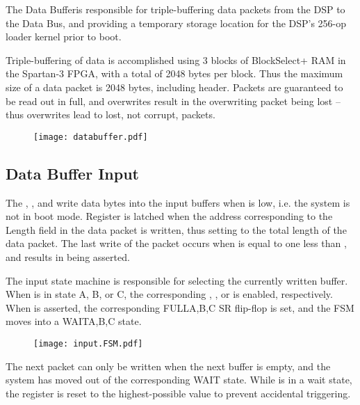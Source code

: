 
The Data Bufferis responsible for triple-buffering data packets from
the DSP to the Data Bus, and providing a temporary storage location
for the DSP's 256-op loader kernel prior to boot.
    
Triple-buffering of data is accomplished using 3 blocks of
BlockSelect+ RAM in the Spartan-3 FPGA, with a total of 2048 bytes per
block. Thus the maximum size of a data packet is 2048 bytes, including
header. Packets are guaranteed to be read out in full, and overwrites
result in the overwriting packet being lost -- thus overwrites lead to
lost, not corrupt, packets.

\begin{figure}
  \texttt{[image: databuffer.pdf]}
  
\end{figure}
        
\subsection{Data Buffer Input}
        
      
The , , and  write
data bytes into the input buffers when  is low, i.e. the
system is not in boot mode. Register  is latched
when the address corresponding to the Length field in the data packet
is written, thus setting  to the total length of
the data packet. The last write of the packet occurs when
 is equal to one less than ,
and results in  being asserted.

The input state machine  is responsible for selecting the
currently written buffer. When  is in state A, B, or C,
the corresponding , , or 
is enabled, respectively. When  is asserted, the
corresponding FULL{A,B,C} SR flip-flop is set, and the FSM moves into
a WAIT{A,B,C} state.

      
\begin{figure}
  \texttt{[image: input.FSM.pdf]}
\end{figure}

        The next packet can only be written when the next buffer is
        empty, and the system has moved out of the corresponding WAIT
        state. While  is in a wait state, the
         register is reset to the highest-possible
        value to prevent accidental triggering.
      
